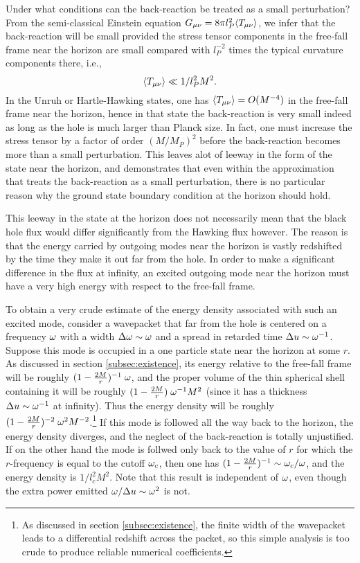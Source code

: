 Under what conditions can the back-reaction be treated
as a small perturbation? From the semi-classical
Einstein equation $G_{\mu\nu}=8\pi l_P^2 \langle
T_{\mu\nu}\rangle$, we infer that the back-reaction will
be small provided the stress tensor components
in the free-fall frame near the horizon are small
compared with $l_P^{-2}$ times the typical curvature
components there, i.e.,
\begin{equation}
\langle T_{\mu\nu}\rangle\ll 1/l_P^2 M^2.
\label{inequality}
\end{equation}
In the Unruh or Hartle-Hawking states, one has $\langle
T_{\mu\nu}\rangle=O(M^{-4})$ in the free-fall frame near the
horizon, hence in that state the back-reaction is very small indeed
as long as the hole is much larger than Planck size.
In fact, one must increase the stress tensor by a
factor of order $(M/M_P)^2$ before the back-reaction
becomes more than a small perturbation. This leaves
alot of leeway in the form of the state near the
horizon, and demonstrates that even within the
approximation that treats the back-reaction as a small
perturbation, there is no particular reason why the
ground state boundary condition at the horizon should
hold.

This leeway in the state at the horizon does not
necessarily mean that the black hole flux
would differ significantly from the Hawking flux
however. The
reason is that the energy carried by outgoing modes
near the horizon is vastly redshifted by the time they
make it out far from the hole. In order to make a
significant difference in the flux at infinity, an
excited outgoing mode near the horizon must have a very
high energy with respect to the free-fall frame.

To obtain a very crude estimate of the energy density
associated with such an excited mode, consider a wavepacket
that far from the hole is centered on a frequency $\omega$
with a width $\Delta\omega\sim\omega$ and a spread in
retarded time $\Delta u\sim\omega^{-1}$.
Suppose this mode is occupied in a one
particle state near the
horizon at some $r$. As discussed in section
\ref{subsec:existence},
its energy relative to the free-fall frame
will be roughly $(1-{2M\over r})^{-1}\; \omega$, and the
proper volume of the thin spherical shell containing it will
be roughly $(1-{2M\over r})\; \omega^{-1}M^2$ (since it has a thickness
$\Delta u\sim \omega^{-1}$ at infinity).
Thus the energy density will be
roughly $(1-{2M\over r})^{-2}\; \omega^2 M^{-2}$.\footnote{As discussed
in section \ref{subsec:existence}, the finite width of the
wavepacket leads to a differential redshift across the
packet, so this simple analysis is too crude to produce
reliable numerical coefficients.}
If this mode is followed all the way back to the
horizon, the energy density diverges, and the neglect
of the back-reaction is totally unjustified. If on the
other hand the mode is follwed only back to the value
of $r$ for which the $r$-frequency is equal to the cutoff
$\omega_c$, then one has $(1-{2M\over r})^{-1}\sim \omega_c/\omega$,
and the energy density is $1/l_c^2M^2$.
Note that this result is
independent of $\omega$, even though the extra power emitted
$\omega/\Delta u\sim\omega^2$ is not.

